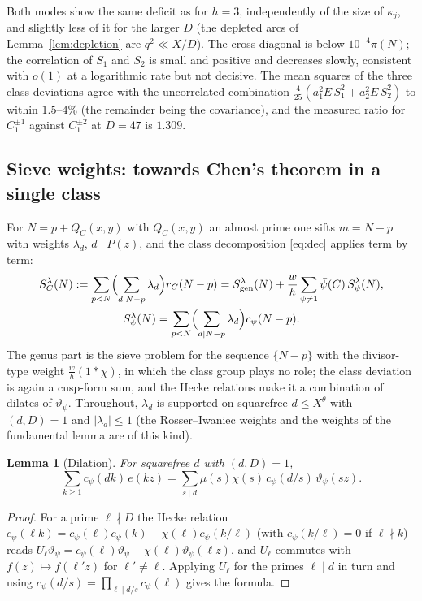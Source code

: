 \documentclass[11pt]{amsart}
\newtheorem{lemma}[theorem]{Lemma}
\theoremstyle{remark}
\newcommand{\vt}{\vartheta}
\newcommand{\gen}{\mathrm{gen}}
\begin{document}
Both modes show the same deficit as for $h=3$, independently of the size of $\kappa_j$, and slightly less of it for the larger $D$ (the depleted arcs of Lemma~\ref{lem:depletion} are $q^2\ll X/D$). The cross diagonal is below $10^{-4}\pi(N)$; the correlation of $S_1$ and $S_2$ is small and positive and decreases slowly, consistent with $o(1)$ at a logarithmic rate but not decisive. The mean squares of the three class deviations agree with the uncorrelated combination $\frac4{25}(a_1^2E\,S_1^2+a_2^2E\,S_2^2)$ to within $1.5$--$4\%$ (the remainder being the covariance), and the measured ratio for $C_1^{\pm1}$ against $C_1^{\pm2}$ at $D=47$ is $1.309$.

\subsection{Sieve weights: towards Chen's theorem in a single class}\label{subsec:sieve}
For $N=p+Q_C(x,y)$ with $Q_C(x,y)$ an almost prime one sifts $m=N-p$ with weights $\lambda_d$, $d\mid P(z)$, and the class decomposition \eqref{eq:dec} applies term by term:
\begin{gather*}
S^\lambda_C(N):=\sum_{p<N}\Bigl(\sum_{d\mid N-p}\lambda_d\Bigr)r_C(N-p)=S^\lambda_\gen(N)+\frac wh\sum_{\psi\ne1}\bar\psi(C)\,S^\lambda_\psi(N),\\
S^\lambda_\psi(N)=\sum_{p<N}\Bigl(\sum_{d\mid N-p}\lambda_d\Bigr)c_\psi(N-p).
\end{gather*}
The genus part is the sieve problem for the sequence $\{N-p\}$ with the divisor-type weight $\frac wh(1*\chi)$, in which the class group plays no role; the class deviation is again a cusp-form sum, and the Hecke relations make it a combination of dilates of $\vt_\psi$. Throughout, $\lambda_d$ is supported on squarefree $d\le X^\theta$ with $(d,D)=1$ and $|\lambda_d|\le1$ (the Rosser--Iwaniec weights and the weights of the fundamental lemma are of this kind).

\begin{lemma}[Dilation]\label{lem:dilation}
For squarefree $d$ with $(d,D)=1$,
\[
\sum_{k\ge1}c_\psi(dk)\,e(kz)=\sum_{s\mid d}\mu(s)\chi(s)\,c_\psi(d/s)\,\vt_\psi(sz).
\]
\end{lemma}
\begin{proof}
For a prime $\ell\nmid D$ the Hecke relation $c_\psi(\ell k)=c_\psi(\ell)c_\psi(k)-\chi(\ell)c_\psi(k/\ell)$ (with $c_\psi(k/\ell)=0$ if $\ell\nmid k$) reads $U_\ell\vt_\psi=c_\psi(\ell)\vt_\psi-\chi(\ell)\vt_\psi(\ell z)$, and $U_\ell$ commutes with $f(z)\mapsto f(\ell'z)$ for $\ell'\ne\ell$. Applying $U_\ell$ for the primes $\ell\mid d$ in turn and using $c_\psi(d/s)=\prod_{\ell\mid d/s}c_\psi(\ell)$ gives the formula.
\end{proof}
\end{document}
